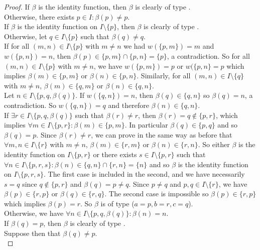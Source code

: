 \documentclass[a4paper,11pt]{article}
\newcommand*\circled[1]{\tikz[baseline=(char.base)]{
            \node[shape=circle,draw,inner sep=2pt] (char) {#1};}}
\theoremstyle{plain}
\theoremstyle{definition}
\theoremstyle{remark}
\begin{document}
\begin{proof}
If $\beta$ is the identity function, then $\beta$ is clearly of type \circled{1}. \\
Otherwise, there exists $p \in I : \beta(p) \neq p$. \\
If $\beta$ is the identity function on $I \setminus \{p\}$, then $\beta$ is clearly of type \circled{1}. \\
Otherwise, let $q \in I \setminus \{p\}$ such that $\beta(q) \neq q$. \\
If for all $(m,n) \in I \setminus \{p\}$ with $m \neq n$ we had $w(\{p,m\})=m$ and $w(\{p,n\})=n$, then $\beta(p) \in \{p,m\} \cap \{p,n\} = \{p\}$, a contradiction. So for all $(m,n) \in I \setminus \{p\}$ with $m \neq n$, we have $w(\{p,m\})=p$ or $w(\{p,n\}=p$ which implies $\beta(m) \in \{p,m\}$ or $\beta(n) \in \{p,n\}$. Similarly, for all $(m,n) \in I \setminus \{q\}$ with $m \neq n$, $\beta(m) \in \{q,m\}$ or $\beta(n) \in \{q,n\}$. \\
Let $n \in I \setminus \{p,q,\beta(q)\}$. If $w(\{q,n\})=n$, then $\beta(q) \in \{q,n\}$ so $\beta(q)=n$, a contradiction. So $w(\{q,n\})=q$ and therefore $\beta(n) \in \{q,n\}$. \\ 
If $\exists r \in I \setminus \{p,q,\beta(q)\}$ such that $\beta(r) \neq r$, then $\beta(r) = q \notin \{p,r\}$, which implies $\forall m \in I \setminus \{p,r\} : \beta(m) \in \{p,m\}$. In particular $\beta(q) \in \{p,q\}$ and so $\beta(q)=p$. Since $\beta(r) \neq r$, we can prove in the same way as before that $\forall m,n \in I \setminus \{r\}$ with $m \neq n$, $\beta(m) \in \{r,m\}$ or $\beta(n) \in \{r,n\}$. So either $\beta$ is the identity function on $I \setminus \{p,r\}$ or there exists $s \in I \setminus \{p,r\}$ such that $\forall n \in I \setminus \{p,r,s\} : \beta(n) \in \{q,n\} \cap \{r,n\} = \{n\}$ and so $\beta$ is the identity function on $I \setminus \{p,r,s\}$. The first case is included in the second, and we have necessarily $s=q$ since $q \notin \{p,r\}$ and $\beta(q) = p \neq q$. Since $p \neq q$ and $p,q \in I \setminus \{r\}$, we have $\beta(p) \in \{r,p\}$ or $\beta(q) \in \{r,q\}$. The second case is impossible so $\beta(p) \in \{r,p\}$ which implies $\beta(p)=r$. So $\beta$ is of type \circled{2} ($a=p, b=r, c=q$). \\
Otherwise, we have $\forall n \in I \setminus \{p,q,\beta(q)\} : \beta(n) = n$. \\
If $\beta(q)=p$, then $\beta$ is clearly of type \circled{1}. \\
Suppose then that $\beta(q) \neq p$. \\

\end{proof}
\end{document}
